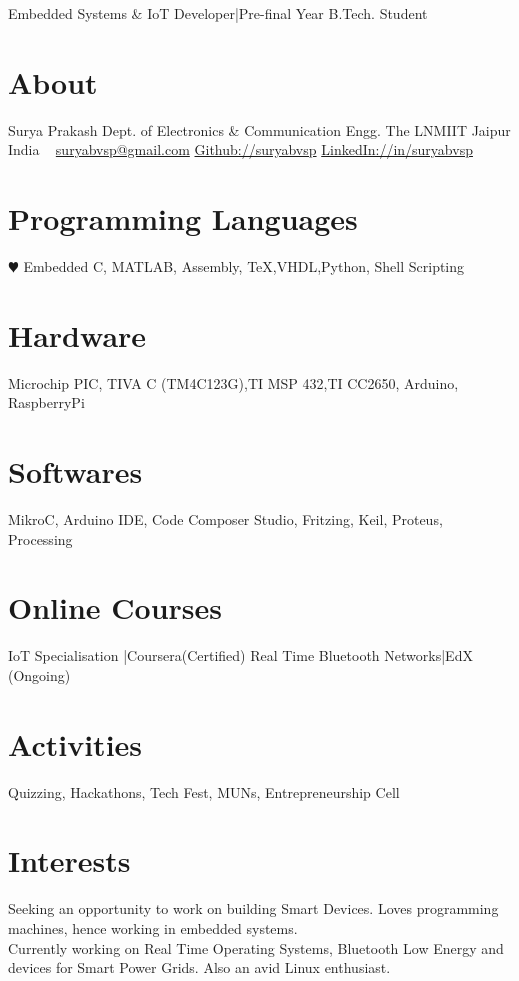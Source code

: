 \documentclass[]{friggeri-cv}
\begin{document}
       {Embedded Systems \& IoT Developer|Pre-final Year B.Tech. Student}

\begin{aside}
  \section{About}
    Surya Prakash
    Dept. of Electronics \& Communication Engg.
    The LNMIIT
    Jaipur
    India
    ~
    \href{mailto:suryabvsp@gmail.com}{suryabvsp@gmail.com}
    \href{https://github.com/suryabvsp/}{Github://suryabvsp}
    \href{https://www.linkedin.com/in/suryabvsp/}{LinkedIn://in/suryabvsp}
    ~
  \section{Programming Languages}
    {\color{red} $\varheartsuit$} Embedded C,
    MATLAB, Assembly,
    \TeX,VHDL,Python,
    Shell Scripting
  \section{Hardware}
    Microchip PIC, TIVA C
    (TM4C123G),TI MSP 432,TI CC2650,
    Arduino, RaspberryPi
  \section{Softwares}
    MikroC, Arduino IDE,
    Code Composer
    Studio, Fritzing, Keil,
    Proteus, Processing
  \section{Online Courses}
    IoT Specialisation
    |Coursera(Certified)
    Real Time Bluetooth Networks|EdX
    (Ongoing) 
    ~
    ~
    ~
    ~
    \section{Activities}
    Quizzing, Hackathons,
    Tech Fest, MUNs,
    Entrepreneurship Cell
\end{aside}

\section{Interests}

Seeking an opportunity to work on building Smart Devices. Loves programming machines, hence working in embedded systems.\\ Currently working on Real Time Operating Systems, Bluetooth Low Energy and devices for Smart Power Grids. Also an avid Linux enthusiast.
\end{document}
